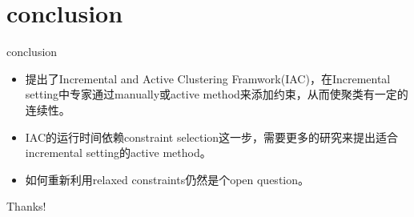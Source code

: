 \documentclass{beamer}
\begin{document}
\section{conclusion}
\begin{frame}{conclusion}
    \begin{itemize}
        \item     提出了Incremental and Active Clustering Framwork(IAC)，在Incremental setting中专家通过manually或active method来添加约束，从而使聚类有一定的连续性。
        \item IAC的运行时间依赖constraint selection这一步，需要更多的研究来提出适合incremental setting的active method。
        \item 如何重新利用relaxed constraints仍然是个open question。
    \end{itemize}


\end{frame}

\begin{frame}
    \begin{center}
        {\Huge\calligra Thanks!}
    \end{center}
\end{frame}
\end{document}

